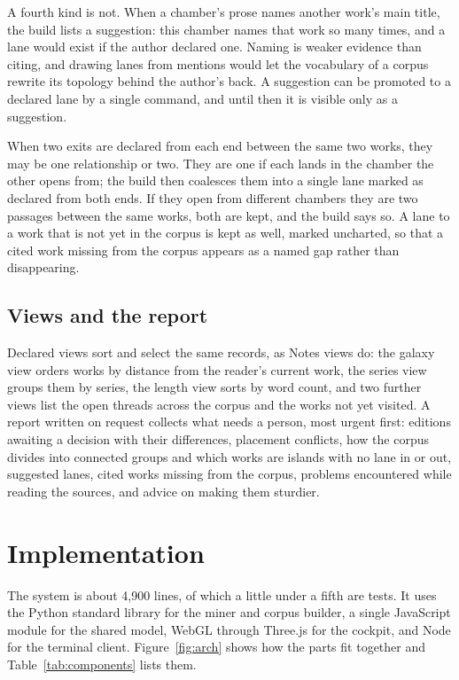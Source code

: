 \documentclass[11pt]{article}
\theoremstyle{remark}
\begin{document}
A fourth kind is not. When a chamber's prose names another work's main title, the build lists a suggestion: this chamber names that work so many times, and a lane would exist if the author declared one. Naming is weaker evidence than citing, and drawing lanes from mentions would let the vocabulary of a corpus rewrite its topology behind the author's back. A suggestion can be promoted to a declared lane by a single command, and until then it is visible only as a suggestion.

When two exits are declared from each end between the same two works, they may be one relationship or two. They are one if each lands in the chamber the other opens from; the build then coalesces them into a single lane marked as declared from both ends. If they open from different chambers they are two passages between the same works, both are kept, and the build says so. A lane to a work that is not yet in the corpus is kept as well, marked uncharted, so that a cited work missing from the corpus appears as a named gap rather than disappearing.

\subsection{Views and the report}

Declared views sort and select the same records, as Notes views do: the galaxy view orders works by distance from the reader's current work, the series view groups them by series, the length view sorts by word count, and two further views list the open threads across the corpus and the works not yet visited. A report written on request collects what needs a person, most urgent first: editions awaiting a decision with their differences, placement conflicts, how the corpus divides into connected groups and which works are islands with no lane in or out, suggested lanes, cited works missing from the corpus, problems encountered while reading the sources, and advice on making them sturdier.

\section{Implementation}
\label{sec:impl}

The system is about 4,900 lines, of which a little under a fifth are tests. It uses the Python standard library for the miner and corpus builder, a single JavaScript module for the shared model, WebGL through Three.js \cite{threejs} for the cockpit, and Node for the terminal client. Figure~\ref{fig:arch} shows how the parts fit together and Table~\ref{tab:components} lists them.
\end{document}
